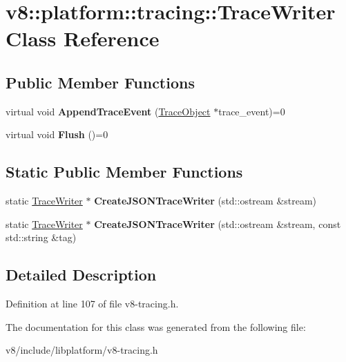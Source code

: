 \hypertarget{classv8_1_1platform_1_1tracing_1_1TraceWriter}{}\section{v8\+:\+:platform\+:\+:tracing\+:\+:Trace\+Writer Class Reference}
\label{classv8_1_1platform_1_1tracing_1_1TraceWriter}
\subsection*{Public Member Functions}
\begin{DoxyCompactItemize}
\item 
\mbox{\label{classv8_1_1platform_1_1tracing_1_1TraceWriter_a1dde3c2f986e08d9e0c3b7e3c0279661}} 
virtual void {\bfseries Append\+Trace\+Event} (\mbox{\hyperlink{classv8_1_1platform_1_1tracing_1_1TraceObject}{Trace\+Object}} $\ast$trace\+\_\+event)=0
\item 
\mbox{\label{classv8_1_1platform_1_1tracing_1_1TraceWriter_acb377e35f2a881b0522d23b3153d9501}} 
virtual void {\bfseries Flush} ()=0
\end{DoxyCompactItemize}
\subsection*{Static Public Member Functions}
\begin{DoxyCompactItemize}
\item 
\mbox{\label{classv8_1_1platform_1_1tracing_1_1TraceWriter_a2d61a62806c9d0b699dd88530891f278}} 
static \mbox{\hyperlink{classv8_1_1platform_1_1tracing_1_1TraceWriter}{Trace\+Writer}} $\ast$ {\bfseries Create\+J\+S\+O\+N\+Trace\+Writer} (std\+::ostream \&stream)
\item 
\mbox{\label{classv8_1_1platform_1_1tracing_1_1TraceWriter_a82d4191d07ddc44af0acf452ea31b318}} 
static \mbox{\hyperlink{classv8_1_1platform_1_1tracing_1_1TraceWriter}{Trace\+Writer}} $\ast$ {\bfseries Create\+J\+S\+O\+N\+Trace\+Writer} (std\+::ostream \&stream, const std\+::string \&tag)
\end{DoxyCompactItemize}


\subsection{Detailed Description}


Definition at line 107 of file v8-\/tracing.\+h.



The documentation for this class was generated from the following file\+:\begin{DoxyCompactItemize}
\item 
v8/include/libplatform/v8-\/tracing.\+h\end{DoxyCompactItemize}
